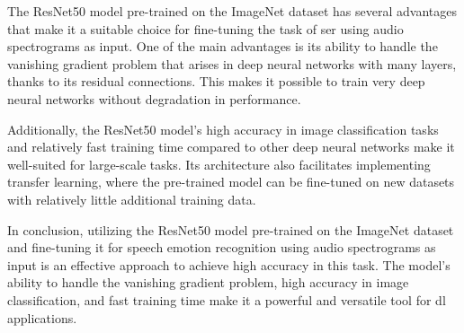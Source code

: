 The ResNet50 model pre-trained on the ImageNet dataset has several advantages that make it a suitable choice for fine-tuning the task of \ac{ser} using audio spectrograms as input. One of the main advantages is its ability to handle the vanishing gradient problem that arises in deep neural networks with many layers, thanks to its residual connections. This makes it possible to train very deep neural networks without degradation in performance.

Additionally, the ResNet50 model's high accuracy in image classification tasks and relatively fast training time compared to other deep neural networks make it well-suited for large-scale tasks. Its architecture also facilitates implementing transfer learning, where the pre-trained model can be fine-tuned on new datasets with relatively little additional training data.

In conclusion, utilizing the ResNet50 model pre-trained on the ImageNet dataset and fine-tuning it for speech emotion recognition using audio spectrograms as input is an effective approach to achieve high accuracy in this task. The model's ability to handle the vanishing gradient problem, high accuracy in image classification, and fast training time make it a powerful and versatile tool for \ac{dl} applications.
